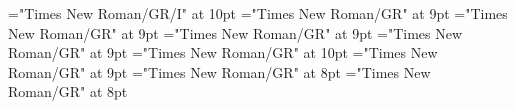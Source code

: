 \documentclass[gps1,twoside]{article}
\begin{document}
\font\spanentranslationtranslationspanexampleexampleexamplessensesensessensesensessubentrysubentriesentryexamplespansensespanspansubentrysubentriesentrysubentriesdiventryletData="Times New Roman/GR/I" at 10pt
\font\semanticdomainssensesensessubentrysubentriesentrybeforesensespanspansubentrysubentriesentrysubentriesdiventryletData="Times New Roman/GR" at 9pt
\font\semanticdomainssensesensessubentrysubentriesentryaftersensespanspansubentrysubentriesentrysubentriesdiventryletData="Times New Roman/GR" at 9pt
\font\spanspansensespanspansubentrysubentriesentrysubentriesdiventryletData="Times New Roman/GR" at 9pt
\font\spanspanspansensespanspansubentrysubentriesentrysubentriesdiventryletData="Times New Roman/GR" at 9pt
\font\spanenspanspanspansensespanspansubentrysubentriesentrysubentriesdiventryletData="Times New Roman/GR" at 10pt
\font\semanticdomainsemanticdomainsemanticdomainssensesensessensesensessubentrysubentriesentrybeforespansensespanspansubentrysubentriesentrysubentriesdiventryletData="Times New Roman/GR" at 9pt
\font\exampleexampleexamplessensesensessensesensessubentrysubentriesentrybeforespansensespanspansubentrysubentriesentrysubentriesdiventryletData="Times New Roman/GR" at 8pt
\font\exampleexampleexamplessensesensessensesensessubentrysubentriesentrybeforeexamplespansensespanspansubentrysubentriesentrysubentriesdiventryletData="Times New Roman/GR" at 8pt
\end{document}
